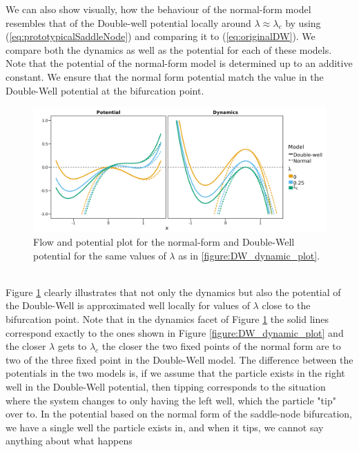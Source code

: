 We can also show visually, how the behaviour of the normal-form model resembles that of the Double-well potential locally around $\lambda \approx \lambda_c$ by using (\ref{eq:prototypicalSaddleNode}) and comparing it to (\ref{eq:originalDW}). We compare both the dynamics as well as the potential for each of these models. Note that the potential of the normal-form model is determined up to an additive constant. We ensure that the normal form potential match the value in the Double-Well potential at the bifurcation point.
\begin{figure}[h!]
    \begin{center}
        \includegraphics[scale = .1]{figures/potential_dynamic_plot.jpeg}
        \caption{Flow and potential plot for the normal-form and Double-Well potential for the same values of $\lambda$ as in \ref{figure:DW_dynamic_plot}.}
        \label{figure:DW_and_Normal_potential_and_dynamic_plot}
    \end{center}
\end{figure}\\
Figure \ref{figure:DW_and_Normal_potential_and_dynamic_plot} clearly illustrates that not only the dynamics but also the potential of the Double-Well is approximated well locally for values of $\lambda$ close to the bifurcation point. Note that in the dynamics facet of Figure \ref{figure:DW_and_Normal_potential_and_dynamic_plot} the solid lines correspond exactly to the ones shown in Figure \ref{figure:DW_dynamic_plot} and the closer $\lambda$ gets to $\lambda_c$ the closer the two fixed points of the normal form are to two of the three fixed point in the Double-Well model. The difference between the potentials in the two models is, if we assume that the particle exists in the right well in the Double-Well potential, then tipping corresponds to the situation where the system changes to only having the left well, which the particle "tip" over to. In the potential based on the normal form of the saddle-node bifurcation, we have a single well the particle exists in, and when it tips, we cannot say anything about what happens\\\\
